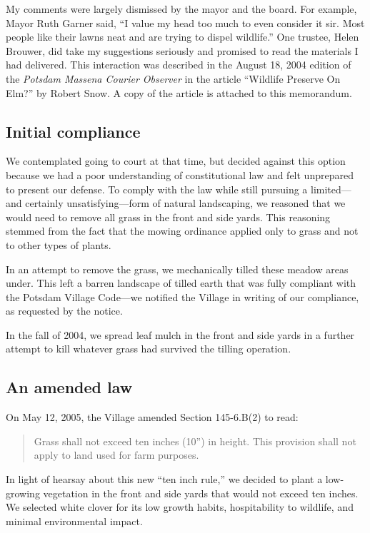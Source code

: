 \documentclass[12pt]{article}
\begin{document}
My comments were largely dismissed by the mayor and the board.
For example, Mayor Ruth Garner said, ``I value my head too much to even consider it sir.  Most people like their lawns neat and are trying to dispel wildlife.''
One trustee, Helen Brouwer, did take my suggestions seriously and promised to read the materials I had delivered.
This interaction was described in the August 18, 2004 edition of the {\em Potsdam Massena Courier Observer} in the article ``Wildlife Preserve On Elm?'' by Robert Snow.
A copy of the article is attached to this memorandum.
 

\subsection{Initial compliance}

We contemplated going to court at that time, but decided against this option because we had a poor understanding of constitutional law and felt unprepared to present our defense.
To comply with the law while still pursuing a limited---and certainly unsatisfying---form of natural landscaping, we reasoned that we would need to remove all grass in the front and side yards.
This reasoning stemmed from the fact that the mowing ordinance applied only to grass and not to other types of plants.

In an attempt to remove the grass, we mechanically tilled these meadow areas under.
This left a barren landscape of tilled earth that was fully compliant with the Potsdam Village Code---we notified the Village in writing of our compliance, as requested by the notice.

In the fall of 2004, we spread leaf mulch in the front and side yards in a further attempt to kill whatever grass had survived the tilling operation.

\subsection{An amended law}

On May 12, 2005, the Village amended Section 145-6.B(2) to read:
\begin{quote}
Grass shall not exceed ten inches (10'') in height.  
This provision shall not apply to land used for farm purposes.
\end{quote}

In light of hearsay about this new ``ten inch rule,'' we decided to plant a low-growing vegetation in the front and side yards that would not exceed ten inches.
We selected white clover for its low growth habits, hospitability to wildlife, and minimal environmental impact.
\end{document}
